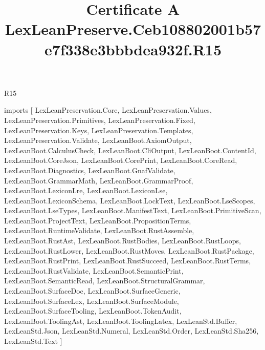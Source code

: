 \begin{lexlean}{R15}
\title{Certificate A LexLeanPreserve.Ceb108802001b57e7f338e3bbbdea932f.R15}
\begin{coremodule}
imports [
  LexLeanPreservation.Core,
  LexLeanPreservation.Values,
  LexLeanPreservation.Primitives,
  LexLeanPreservation.Fixed,
  LexLeanPreservation.Keys,
  LexLeanPreservation.Templates,
  LexLeanPreservation.Validate,
  LexLeanBoot.AxiomOutput,
  LexLeanBoot.CalculusCheck,
  LexLeanBoot.CliOutput,
  LexLeanBoot.ContentId,
  LexLeanBoot.CoreJson,
  LexLeanBoot.CorePrint,
  LexLeanBoot.CoreRead,
  LexLeanBoot.Diagnostics,
  LexLeanBoot.GnafValidate,
  LexLeanBoot.GrammarMath,
  LexLeanBoot.GrammarProof,
  LexLeanBoot.LexiconLre,
  LexLeanBoot.LexiconLse,
  LexLeanBoot.LexiconSchema,
  LexLeanBoot.LockText,
  LexLeanBoot.LseScopes,
  LexLeanBoot.LseTypes,
  LexLeanBoot.ManifestText,
  LexLeanBoot.PrimitiveScan,
  LexLeanBoot.ProjectText,
  LexLeanBoot.PropositionTerms,
  LexLeanBoot.RuntimeValidate,
  LexLeanBoot.RustAssemble,
  LexLeanBoot.RustAst,
  LexLeanBoot.RustBodies,
  LexLeanBoot.RustLoops,
  LexLeanBoot.RustLower,
  LexLeanBoot.RustMoves,
  LexLeanBoot.RustPackage,
  LexLeanBoot.RustPrint,
  LexLeanBoot.RustSucceed,
  LexLeanBoot.RustTerms,
  LexLeanBoot.RustValidate,
  LexLeanBoot.SemanticPrint,
  LexLeanBoot.SemanticRead,
  LexLeanBoot.StructuralGrammar,
  LexLeanBoot.SurfaceDoc,
  LexLeanBoot.SurfaceGeneric,
  LexLeanBoot.SurfaceLex,
  LexLeanBoot.SurfaceModule,
  LexLeanBoot.SurfaceTooling,
  LexLeanBoot.TokenAudit,
  LexLeanBoot.ToolingAst,
  LexLeanBoot.ToolingLatex,
  LexLeanStd.Buffer,
  LexLeanStd.Json,
  LexLeanStd.Numeral,
  LexLeanStd.Order,
  LexLeanStd.Sha256,
  LexLeanStd.Text
]


\end{coremodule}
\end{lexlean}
